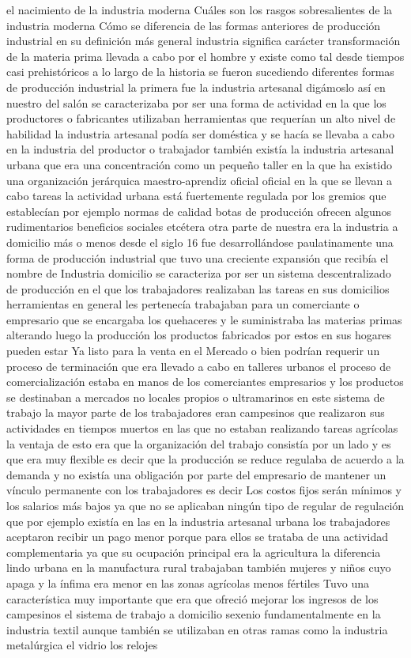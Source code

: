 \documentclass[12pt]{book}++
\begin{document}
el nacimiento de la industria moderna Cuáles son los rasgos sobresalientes de la industria moderna Cómo se diferencia de las formas anteriores de producción industrial en su definición más general industria significa carácter transformación de la materia prima llevada a cabo por el hombre y existe como tal desde tiempos casi prehistóricos a lo largo de la historia se fueron sucediendo diferentes formas de producción industrial la primera fue la industria artesanal digámoslo así en nuestro del salón se caracterizaba por ser una forma de actividad en la que los productores o fabricantes utilizaban herramientas que requerían un alto nivel de habilidad la industria artesanal podía ser doméstica y se hacía se llevaba a cabo en la industria del productor o trabajador también existía la industria artesanal urbana que era una concentración como un pequeño taller en la que ha existido una organización jerárquica maestro-aprendiz oficial oficial en la que se llevan a cabo tareas la actividad urbana está fuertemente regulada por los gremios que establecían por ejemplo normas de calidad botas de producción ofrecen algunos rudimentarios beneficios sociales etcétera otra parte de nuestra era la industria a domicilio más o menos desde el siglo 16 fue desarrollándose paulatinamente una forma de producción industrial que tuvo una creciente expansión que recibía el nombre de Industria domicilio se caracteriza por ser un sistema descentralizado de producción en el que los trabajadores realizaban las tareas en sus domicilios herramientas en general les pertenecía trabajaban para un comerciante o empresario que se encargaba los quehaceres y le suministraba las materias primas alterando luego la producción los productos fabricados por estos en sus hogares pueden estar Ya listo para la venta en el Mercado o bien podrían requerir un proceso de terminación que era llevado a cabo en talleres urbanos el proceso de comercialización estaba en manos de los comerciantes empresarios y los productos se destinaban a mercados no locales propios o ultramarinos en este sistema de trabajo la mayor parte de los trabajadores eran campesinos que realizaron sus actividades en tiempos muertos en las que no estaban realizando tareas agrícolas la ventaja de esto era que la organización del trabajo consistía por un lado y es que era muy flexible es decir que la producción se reduce regulaba de acuerdo a la demanda y no existía una obligación por parte del empresario de mantener un vínculo permanente con los trabajadores es decir Los costos fijos serán mínimos y los salarios más bajos ya que no se aplicaban ningún tipo de regular de regulación que por ejemplo existía en las en la industria artesanal urbana los trabajadores aceptaron recibir un pago menor porque para ellos se trataba de una actividad complementaria ya que su ocupación principal era la agricultura la diferencia lindo urbana en la manufactura rural trabajaban también mujeres y niños cuyo apaga y la ínfima era menor en las zonas agrícolas menos fértiles Tuvo una característica muy importante que era que ofreció mejorar los ingresos de los campesinos el sistema de trabajo a domicilio sexenio fundamentalmente en la industria textil aunque también se utilizaban en otras ramas como la industria metalúrgica el vidrio los relojes
\end{document}
